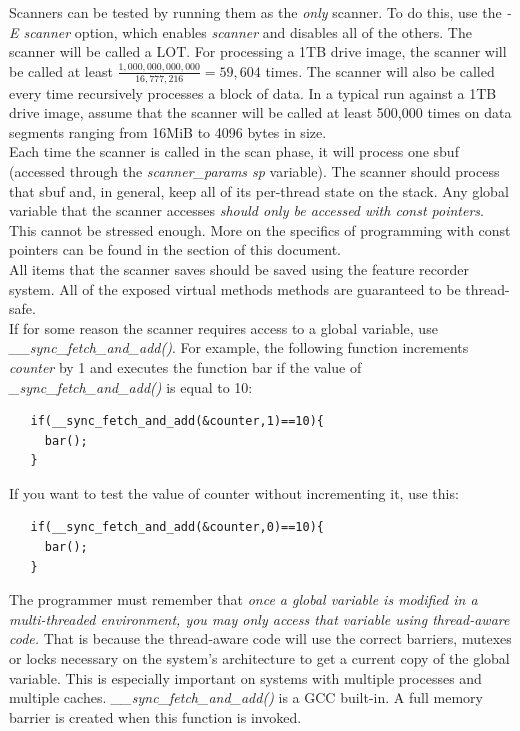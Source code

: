 \documentclass[11pt,fleqn]{article} %
\begin{document}
Scanners can be tested by running them as the \emph{only} scanner. To do this, use the \emph{-E scanner} option, which
enables \emph{scanner} and disables all of the others. The scanner will be called a LOT. For processing a 1TB drive image,
the scanner will be called at least \(\frac{1,000,000,000,000}{16,777,216} = 59,604\) times.  The scanner will also be called every time \bulk recursively processes a block of data. In a typical run against a 1TB drive image, assume that the scanner will be called at least 500,000 times on data segments ranging from 16MiB to 4096 bytes in size.\\

Each time the scanner is called in the scan phase, it will process one sbuf (accessed through the \textit{scanner\_params sp} variable). The scanner should process that sbuf and, in general, keep all of its per-thread state on the stack. Any global variable that the scanner accesses \emph{should only be accessed with const pointers}. This cannot be stressed enough. More on the specifics of programming with const pointers can be found in the  section of this document. \\

All items that the scanner saves should be saved using the \bulk feature recorder system. All of the exposed virtual methods methods are guaranteed to be thread-safe. \\

If for some reason the scanner requires access to a global variable, use
\textit{\_\_sync\_fetch\_and\_add()}. For example, the following function increments \textit{counter} by 1 and
executes the function bar\(\) if the value of \textit{\_sync\_fetch\_and\_add()} is equal to 10:

\lstset{style=codelisting}
\begin{lstlisting}
   if(__sync_fetch_and_add(&counter,1)==10){
     bar();
   }
\end{lstlisting}

If you want to test the value of counter without incrementing it, use
this:
\begin{lstlisting}
   if(__sync_fetch_and_add(&counter,0)==10){
     bar();
   }
\end{lstlisting}

The programmer must remember that \emph{once a global variable is modified in a multi-threaded environment, you may only access that variable using thread-aware code.} That is because the thread-aware code will use the correct barriers, mutexes or locks necessary on the system's architecture to get a current copy of the global variable. This is especially important on systems with multiple processes and multiple caches. \textit{\_\_sync\_fetch\_and\_add()} is a GCC built-in. A full memory barrier is created when this function is invoked.\\
\end{document}
